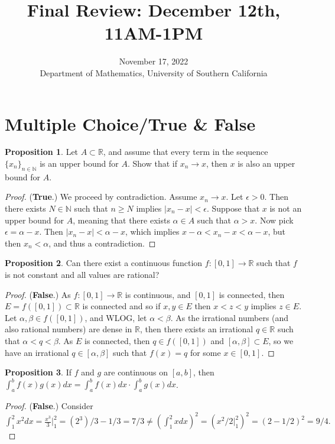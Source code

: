 \documentclass[oneside]{amsart}
\title{Final Review: December 12th, 11AM-1PM}
\date{November 17, 2022 \\ {Department of Mathematics, University of Southern California}}
\theoremstyle{definition}
\newtheorem{prop}{Proposition}[section]
\newcommand{\rr}{\mathbb R}
\newcommand{\nn}{\mathbb N}
\begin{document}
\maketitle
\setcounter{tocdepth}{4}
\setcounter{secnumdepth}{4}
\tableofcontents
\section{Multiple Choice/True \& False}
\begin{prop} Let $A \subset \rr$, and assume that every term in the sequence $\{ x_n \}_{n \in \nn}$ is an upper bound for $A$. Show that if $x_n \to x$, then $x$ is also an upper bound for $A$.
	
\end{prop}
\begin{proof} (\textbf{True}.) We proceed by contradiction. Assume $x_n \to x$. Let $\epsilon > 0$. Then there exists $N \in \nn$ such that $n \geq N$ implies $|x_n - x|<\epsilon$. Suppose that $x$ is not an upper bound for $A$, meaning that there exists $\alpha \in A$ such that $\alpha > x$. Now pick $\epsilon = \alpha -x$. Then $|x_n - x| < \alpha -x$, which implies $x-\alpha < x_n -x<\alpha - x$, but then $x_n<\alpha$, and thus a contradiction.
\end{proof}
\begin{prop}
Can there exist a continuous function $f \colon [0,1] \to \rr$ such that $f$ is not constant and all values are rational?
\end{prop}
\begin{proof}(\textbf{False}.) As $f \colon [0,1] \to \rr$ is continuous, and $[0,1]$ is connected, then $E = f([0,1]) \subset \rr$ is connected and so if $x,y \in E$ then $x<z<y$ implies $z \in E$. Let $\alpha, \beta \in f([0,1])$, and WLOG, let $\alpha < \beta$. As the irrational numbers (and also rational numbers) are dense in $\rr$, then there exists an irrational $q \in \rr$ such that $\alpha < q < \beta$. As $E$ is connected, then $q \in f([0,1])$ and $[\alpha, \beta ] \subset E$, so we have an irrational $q \in [\alpha, \beta]$ such that $f(x) = q$ for some $x \in [0,1]$.
\end{proof}

\begin{prop}
If $f$ and $g$ are continuous on $[a,b]$, then $ \int_a^b f(x) g(x) dx = \int_a^b f(x) dx \cdot \int_a^b g(x)dx$.	
\end{prop}
\begin{proof}(\textbf{False}.) Consider $\int_1^2 x^2 dx = \frac{x^3}{3}|_1^2 = (2^3)/3 -1/3 = 7/3 \neq (\int_1^2 x dx )^2 = (x^2/2|_1^2)^2= (2-1/2)^2 = 9/4. $	
\end{proof}
\end{document}
